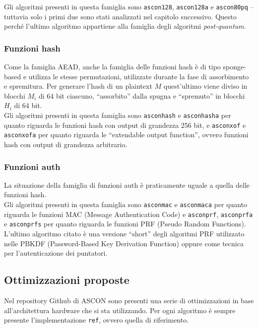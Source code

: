 \noindent Gli algoritmi presenti in questa famiglia sono \texttt{ascon128}, \texttt{ascon128a} e \texttt{ascon80pq} – tuttavia solo i primi due sono stati analizzati nel capitolo successivo. Questo perché l'ultimo algoritmo appartiene alla famiglia degli algoritmi \textit{post-quantum}.

\subsubsection{Funzioni hash}

Come la famiglia AEAD, anche la famiglia delle funzioni hash è di tipo sponge-based e utilizza le stesse permutazioni, utilizzate durante la fase di assorbimento e spremitura. Per generare l'hash di un plaintext $M$ quest'ultimo viene diviso in blocchi $M_i$ di 64 bit ciascuno, ``assorbito'' dalla spugna e ``spremuto'' in blocchi $H_i$ di 64 bit. \\

\noindent Gli algoritmi presenti in questa famiglia sono \texttt{asconhash} e \texttt{asconhasha} per quanto riguarda le funzioni hash con output di grandezza 256 bit, e \texttt{asconxof} e \texttt{asconxofa} per quanto riguarda le ``extendable output function'', ovvero funzioni hash con output di grandezza arbitrario\cite{ascon-specification}.

\subsubsection{Funzioni auth}

La situazione della famiglia di funzioni auth è praticamente uguale a quella delle funzioni hash. \\

\noindent Gli algoritmi presenti in questa famiglia sono \texttt{asconmac} e \texttt{asconmaca} per quanto riguarda le funzioni MAC (Message Authentication Code) e \texttt{asconprf}, \texttt{asconprfa} e \texttt{asconprfs} per quanto riguarda le funzioni PRF (Pseudo Random Functions)\cite{ascon-specification-pdf}. L'ultimo algoritmo citato è una versione ``short'' degli algoritmi PRF utilizzato nelle PBKDF (Password-Based Key Derivation Function) oppure come tecnica per l'autenticazione dei puntatori.

\subsection{Ottimizzazioni proposte}

Nel repository Github di ASCON sono presenti una serie di ottimizzazioni in base all'architettura hardware che si sta utilizzando. Per ogni algoritmo è sempre presente l'implementazione \texttt{ref}, ovvero quella di riferimento. \\

